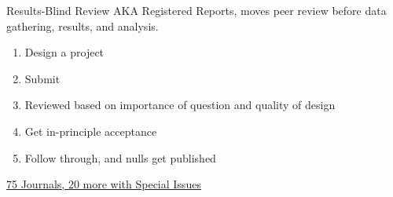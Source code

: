 \documentclass[aspectratio=169]{beamer}
\begin{document}
\begin{frame}{Results-Blind Review}
AKA Registered Reports, moves peer review before data gathering, results, and analysis.

\begin{enumerate}[<.->]
\item Design a project
\item Submit
\item Reviewed based on importance of question and quality of design
\item Get in-principle acceptance
\item Follow through, and nulls get published
\end{enumerate}
\href{https://osf.io/8mpji/wiki/home/}{75 Journals, 20 more with Special Issues }
\end{frame}

{ %
	\usebackgroundtemplate{}
    \begin{frame}[plain]
     \end{frame}
}
\end{document}
